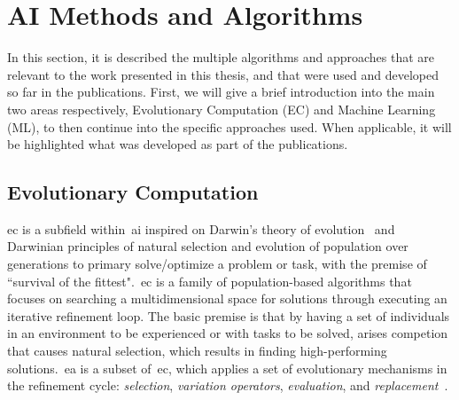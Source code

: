 \section{AI Methods and Algorithms}  \normalfont

In this section, it is described the multiple algorithms and approaches that are relevant to the work presented in this thesis, and that were used and developed so far in the publications. First, we will give a brief introduction into the main two areas respectively, Evolutionary Computation (EC) and Machine Learning (ML), to then continue into the specific approaches used. When applicable, it will be highlighted what was developed as part of the publications.

\subsection{Evolutionary Computation}



\acrfull{ec} is a subfield within~\acrshort{ai} inspired on Darwin's theory of evolution~\cite{darwin1859-originSpecies} and Darwinian principles of natural selection and evolution of population over generations to primary solve/optimize a problem or task, with the premise of ``survival of the fittest".~\acrshort{ec} is a family of population-based algorithms that focuses on searching a multidimensional space for solutions through executing an iterative refinement loop. The basic premise is that by having a set of individuals in an environment to be experienced or with tasks to be solved, arises competion that causes natural selection, which results in finding high-performing solutions.~\acrfull{ea} is a subset of~\acrshort{ec}, which applies a set of evolutionary mechanisms in the refinement cycle: \textit{selection}, \textit{variation operators}, \textit{evaluation}, and \textit{replacement}~\cite{eiben2007-introductionEC}.

